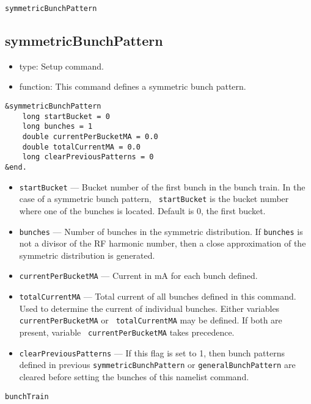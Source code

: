 \documentclass[11pt]{article}
\begin{document}
\newpage
\begin{center}{\tt symmetricBunchPattern}\end{center}
\subsection{symmetricBunchPattern}

\begin{itemize}
\item type: Setup command. 
\item function: This command defines a symmetric bunch pattern.
\end{itemize}
\begin{verbatim}
&symmetricBunchPattern
    long startBucket = 0
    long bunches = 1
    double currentPerBucketMA = 0.0
    double totalCurrentMA = 0.0
    long clearPreviousPatterns = 0
&end.
\end{verbatim}
\begin{itemize}
\item {\tt startBucket} --- Bucket number of the first bunch in the
bunch train. In the case of a symmetric bunch pattern, {\tt
startBucket} is the bucket number where one of the bunches is
located. Default is 0, the first bucket.
\item {\tt bunches} --- Number of bunches in the symmetric
distribution. If {\tt bunches} is not a divisor of the RF harmonic
number, then a close approximation of the symmetric distribution is
generated.
\item {\tt currentPerBucketMA} --- Current in mA for each bunch
defined.
\item {\tt totalCurrentMA} --- Total current of all bunches defined
in this command. Used to determine the current of individual
bunches. Either variables {\tt currentPerBucketMA} or {\tt
totalCurrentMA} may be defined.  If both are present, variable {\tt
currentPerBucketMA} takes precedence.
\item {\tt clearPreviousPatterns} --- If this flag is set to 1, then
bunch patterns defined in previous {\tt symmetricBunchPattern} or
{\tt generalBunchPattern} are cleared before setting the bunches of
this namelist command.
\end{itemize}

\newpage
\begin{center}{\tt bunchTrain}\end{center}
\end{document}
